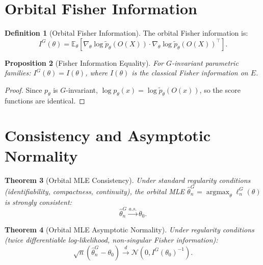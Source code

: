 \documentclass[11pt,twoside,openright]{book}
\theoremstyle{plain}
\newtheorem{theorem}{Theorem}[chapter]
\newtheorem{proposition}[theorem]{Proposition}
\theoremstyle{definition}
\newtheorem{definition}[theorem]{Definition}
\theoremstyle{remark}
\newcommand{\calN}{\mathcal{N}}
\newcommand{\E}{\mathbb{E}}
\DeclareMathOperator{\argmax}{argmax}
\begin{document}
\section{Orbital Fisher Information}

\begin{definition}[Orbital Fisher Information]
The orbital Fisher information is:
\begin{equation}
I^G(\theta) = \E_\theta\left[\nabla_\theta \log \tilde{p}_\theta(O(X)) \cdot \nabla_\theta \log \tilde{p}_\theta(O(X))^\top\right].
\label{eq:orbital-fisher}
\end{equation}
\end{definition}

\begin{proposition}[Fisher Information Equality]
\label{prop:fisher-equality}
For $G$-invariant parametric families: $I^G(\theta) = I(\theta)$, where $I(\theta)$ is the classical Fisher information on $E$.
\end{proposition}

\begin{proof}
Since $p_\theta$ is $G$-invariant, $\log p_\theta(x) = \log \tilde{p}_\theta(O(x))$, so the score functions are identical.
\end{proof}

\section{Consistency and Asymptotic Normality}

\begin{theorem}[Orbital MLE Consistency]
\label{thm:orbital-mle-consistency}
Under standard regularity conditions (identifiability, compactness, continuity), the orbital MLE $\hat{\theta}_n^G = \argmax_\theta \ell_n^G(\theta)$ is strongly consistent:
\begin{equation}
\hat{\theta}_n^G \xrightarrow{a.s.} \theta_0.
\label{eq:orbital-mle-consistency}
\end{equation}
\end{theorem}

\begin{theorem}[Orbital MLE Asymptotic Normality]
\label{thm:orbital-mle-normality}
Under regularity conditions (twice differentiable log-likelihood, non-singular Fisher information):
\begin{equation}
\sqrt{n}(\hat{\theta}_n^G - \theta_0) \xrightarrow{d} \calN(0, I^G(\theta_0)^{-1}).
\label{eq:orbital-mle-normality}
\end{equation}
\end{theorem}
\end{document}
